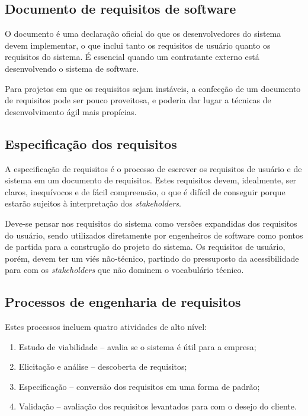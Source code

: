 \documentclass[article, a4paper, oneside, 11pt, english, brazil, sumario=tradicional]{abntex2}
\begin{document}
\subsection{Documento de requisitos de software}
\label{sec:org29fdbc5}

O  documento é  uma declaração  oficial do  que os  desenvolvedores do
sistema devem implementar, o que inclui tanto os requisitos de usuário
quanto os  requisitos do  sistema. É  essencial quando  um contratante
externo está desenvolvendo o sistema de software.

Para projetos em que os requisitos  sejam instáveis, a confecção de um
documento de requisitos pode ser pouco proveitosa, e poderia dar lugar
a técnicas de desenvolvimento ágil mais propícias.

\subsection{Especificação dos requisitos}
\label{sec:org12c92ca}

A especificação de  requisitos é o processo de  escrever os requisitos
de  usuário  e  de  sistema  em  um  documento  de  requisitos.  Estes
requisitos  devem,  idealmente, ser  claros,  inequívocos  e de  fácil
compreensão, o  que é difícil  de conseguir porque estarão  sujeitos à
interpretação dos \emph{stakeholders}.

Deve-se pensar nos  requisitos do sistema como  versões expandidas dos
requisitos do usuário, sendo utilizados diretamente por engenheiros de
software  como pontos  de  partida  para a  construção  do projeto  do
sistema.  Os  requisitos   de  usuário,  porém,  devem   ter  um  viés
não-técnico,  partindo do  pressuposto da  acessibilidade para  com os
\emph{stakeholders} que não dominem o vocabulário técnico.

\subsection{Processos de engenharia de requisitos}
\label{sec:org0dc6bff}

Estes processos incluem quatro atividades de alto nível:

\begin{enumerate}
\item Estudo de viabilidade -- avalia se o sistema é útil para a empresa;
\item Elicitação e análise -- descoberta de requisitos;
\item Especificação -- conversão dos requisitos em uma forma de padrão;
\item Validação -- avaliação dos  requisitos levantados para com o desejo
do cliente.
\end{enumerate}
\end{document}
